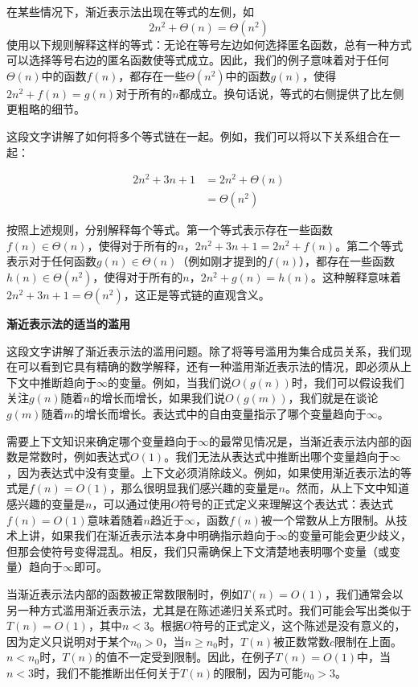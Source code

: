 \documentclass[lang=cn,newtx,10pt,scheme=chinese]{elegantbook}
\begin{document}
在某些情况下，渐近表示法出现在等式的左侧，如$$2 n^2+\Theta(n)=\Theta\left(n^2\right)$$使用以下规则解释这样的等式：无论在等号左边如何选择匿名函数，总有一种方式可以选择等号右边的匿名函数使等式成立。因此，我们的例子意味着对于任何$\Theta(n)$中的函数$f(n)$，都存在一些$\Theta\left(n^2\right)$中的函数$g(n)$，使得$2 n^2+f(n)=g(n)$对于所有的$n$都成立。换句话说，等式的右侧提供了比左侧更粗略的细节。

这段文字讲解了如何将多个等式链在一起。例如，我们可以将以下关系组合在一起：

$$
\begin{aligned}
2 n^2+3 n+1 & =2 n^2+\Theta(n) \\
& =\Theta\left(n^2\right)
\end{aligned}
$$

按照上述规则，分别解释每个等式。第一个等式表示存在一些函数$f(n) \in \Theta(n)$，使得对于所有的$n$，$2 n^2+3 n+1=2 n^2+f(n)$。第二个等式表示对于任何函数$g(n) \in \Theta(n)$（例如刚才提到的$f(n)$），都存在一些函数$h(n) \in \Theta\left(n^2\right)$，使得对于所有的$n$，$2 n^2+g(n)=h(n)$。这种解释意味着$2 n^2+3 n+1=\Theta\left(n^2\right)$，这正是等式链的直观含义。

\textbf{渐近表示法的适当的滥用}

这段文字讲解了渐近表示法的滥用问题。除了将等号滥用为集合成员关系，我们现在可以看到它具有精确的数学解释，还有一种滥用渐近表示法的情况，即必须从上下文中推断趋向于$\infty$的变量。例如，当我们说$O(g(n))$时，我们可以假设我们关注$g(n)$随着$n$的增长而增长，如果我们说$O(g(m))$，我们就是在谈论$g(m)$随着$m$的增长而增长。表达式中的自由变量指示了哪个变量趋向于$\infty$。

需要上下文知识来确定哪个变量趋向于$\infty$的最常见情况是，当渐近表示法内部的函数是常数时，例如表达式$O(1)$。我们无法从表达式中推断出哪个变量趋向于$\infty$，因为表达式中没有变量。上下文必须消除歧义。例如，如果使用渐近表示法的等式是$f(n)=O(1)$，那么很明显我们感兴趣的变量是$n$。然而，从上下文中知道感兴趣的变量是$n$，可以通过使用$O$符号的正式定义来理解这个表达式：表达式$f(n)=O(1)$意味着随着$n$趋近于$\infty$，函数$f(n)$被一个常数从上方限制。从技术上讲，如果我们在渐近表示法本身中明确指示趋向于$\infty$的变量可能会更少歧义，但那会使符号变得混乱。相反，我们只需确保上下文清楚地表明哪个变量（或变量）趋向于$\infty$即可。

当渐近表示法内部的函数被正常数限制时，例如$T(n)=O(1)$，我们通常会以另一种方式滥用渐近表示法，尤其是在陈述递归关系式时。我们可能会写出类似于$T(n)=O(1)$，其中$n<3$。根据$O$符号的正式定义，这个陈述是没有意义的，因为定义只说明对于某个$n_0>0$，当$n \geq n_0$时，$T(n)$被正数常数$c$限制在上面。$n<n_0$时，$T(n)$的值不一定受到限制。因此，在例子$T(n)=O(1)$中，当$n<3$时，我们不能推断出任何关于$T(n)$的限制，因为可能$n_0>3$。
\end{document}
